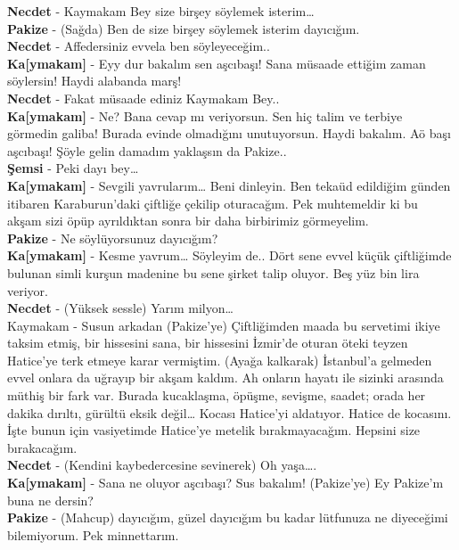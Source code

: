 \documentclass[]{book}
\begin{document}
\textbf{Necdet} - Kaymakam Bey size birşey söylemek isterim\ldots{}\\
\textbf{Pakize} - (Sağda) Ben de size birşey söylemek isterim dayıcığım.\\
\textbf{Necdet} - Affedersiniz evvela ben söyleyeceğim..\\
\textbf{Ka{[}ymakam{]}} - Eyy dur bakalım sen aşcıbaşı! Sana müsaade ettiğim zaman söylersin! Haydi alabanda marş!\\
\textbf{Necdet} - Fakat müsaade ediniz Kaymakam Bey..\\
\textbf{Ka{[}ymakam{]}} - Ne? Bana cevap mı veriyorsun. Sen hiç talim ve terbiye görmedin galiba! Burada evinde olmadığını unutuyorsun. Haydi bakalım. Aö başı aşcıbaşı! Şöyle gelin damadım yaklaşsın da Pakize..\\
\textbf{Şemsi} - Peki dayı bey\ldots{}\\
\textbf{Ka{[}ymakam{]}} - Sevgili yavrularım\ldots{} Beni dinleyin. Ben tekaüd edildiğim günden itibaren Karaburun'daki çiftliğe çekilip oturacağım. Pek muhtemeldir ki bu akşam sizi öpüp ayrıldıktan sonra bir daha birbirimiz görmeyelim.\\
\textbf{Pakize} - Ne söylüyorsunuz dayıcığım?\\
\textbf{Ka{[}ymakam{]}} - Kesme yavrum\ldots{} Söyleyim de.. Dört sene evvel küçük çiftliğimde bulunan simli kurşun madenine bu sene şirket talip oluyor. Beş yüz bin lira veriyor.\\
\textbf{Necdet} - (Yüksek sessle) Yarım milyon\ldots{}\\
Kaymakam - Susun arkadan (Pakize'ye) Çiftliğimden maada bu servetimi ikiye taksim etmiş, bir hissesini sana, bir hissesini İzmir'de oturan öteki teyzen Hatice'ye terk etmeye karar vermiştim. (Ayağa kalkarak) İstanbul'a gelmeden evvel onlara da uğrayıp bir akşam kaldım. Ah onların hayatı ile sizinki arasında müthiş bir fark var. Burada kucaklaşma, öpüşme, sevişme, saadet; orada her dakika dırıltı, gürültü eksik değil\ldots{} Kocası Hatice'yi aldatıyor. Hatice de kocasını. İşte bunun için vasiyetimde Hatice'ye metelik bırakmayacağım. Hepsini size bırakacağım.\\
\textbf{Necdet} - (Kendini kaybedercesine sevinerek) Oh yaşa\ldots.\\
\textbf{Ka{[}ymakam{]}} - Sana ne oluyor aşcıbaşı? Sus bakalım! (Pakize'ye) Ey Pakize'm buna ne dersin?\\
\textbf{Pakize} - (Mahcup) dayıcığım, güzel dayıcığım bu kadar lütfunuza ne diyeceğimi bilemiyorum. Pek minnettarım.\\
\end{document}
